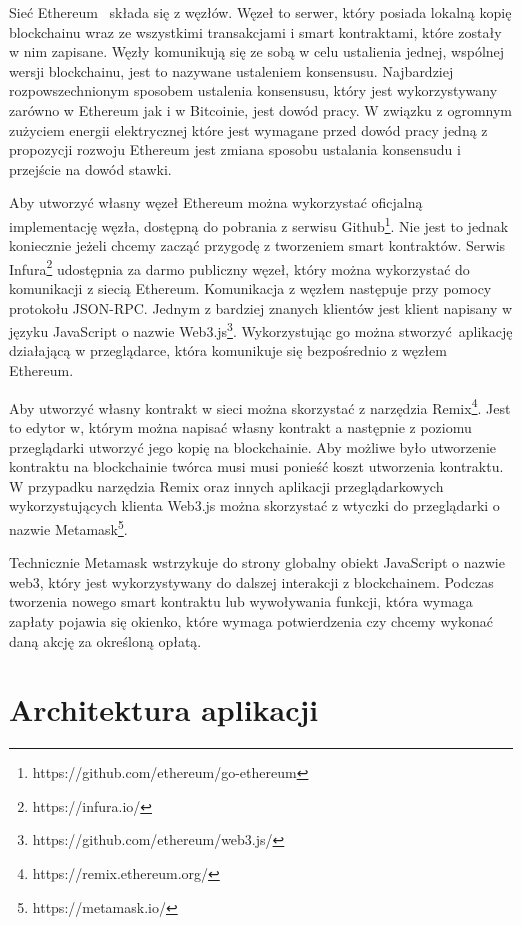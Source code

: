 \documentclass[]{llncs}
\renewcommand{\cite}[1]{~\oldcite{#1}}
\begin{document}
  Sieć Ethereum\cite{ethereum-doc} składa się z węzłów. Węzeł to serwer, który
  posiada lokalną kopię blockchainu wraz ze wszystkimi transakcjami i smart
  kontraktami, które zostały w nim zapisane. Węzły komunikują się ze sobą w celu
  ustalienia jednej, wspólnej wersji blockchainu, jest to nazywane ustaleniem
  konsensusu. Najbardziej rozpowszechnionym sposobem ustalenia konsensusu, który
  jest wykorzystywany zarówno w Ethereum jak i w Bitcoinie, jest dowód pracy. W
  związku z ogromnym zużyciem energii elektrycznej które jest wymagane przed
  dowód pracy jedną z propozycji rozwoju Ethereum jest zmiana sposobu ustalania
  konsensudu i przejście na dowód stawki.\cite{proof-of-stake}

  Aby utworzyć własny węzeł Ethereum można wykorzystać oficjalną implementację
  węzła, dostępną do pobrania z serwisu
  Github\footnote{https://github.com/ethereum/go-ethereum}. Nie jest to jednak
  koniecznie jeżeli chcemy zacząć przygodę z tworzeniem smart kontraktów. Serwis
  Infura\footnote{https://infura.io/} udostępnia za darmo publiczny węzeł, który
  można wykorzystać do komunikacji z siecią Ethereum. Komunikacja z węzłem
  następuje przy pomocy protokołu JSON-RPC. Jednym z bardziej znanych klientów
  jest klient napisany w języku JavaScript o nazwie
  Web3.js\footnote{https://github.com/ethereum/web3.js/}. Wykorzystując go można
  stworzyć aplikację działającą w przeglądarce, która komunikuje się
  bezpośrednio z węzłem Ethereum.

  Aby utworzyć własny kontrakt w sieci można skorzystać z narzędzia
  Remix\footnote{https://remix.ethereum.org/}. Jest to edytor w, którym można
  napisać własny kontrakt a następnie z poziomu przeglądarki utworzyć jego kopię
  na blockchainie. Aby możliwe było utworzenie kontraktu na blockchainie twórca
  musi musi ponieść koszt utworzenia kontraktu. W przypadku narzędzia Remix oraz
  innych aplikacji przeglądarkowych wykorzystujących klienta Web3.js można
  skorzystać z wtyczki do przeglądarki o nazwie
  Metamask\footnote{https://metamask.io/}.

  Technicznie Metamask wstrzykuje do strony globalny obiekt JavaScript o nazwie
  web3, który jest wykorzystywany do dalszej interakcji z blockchainem. Podczas
  tworzenia nowego smart kontraktu lub wywoływania funkcji, która wymaga zapłaty
  pojawia się okienko, które wymaga potwierdzenia czy chcemy wykonać daną akcję
  za określoną opłatą.

\section{Architektura aplikacji}
\end{document}
